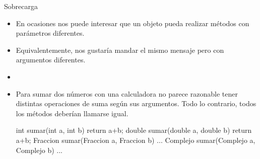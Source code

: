 \documentclass[10pt,envcountsect,spanish]{beamer}
\begin{document}
\begin{frame}[fragile]{Sobrecarga}



\begin{itemize} \large 
\item En ocasiones nos puede interesar que un objeto pueda realizar métodos con parámetros diferentes.

\item Equivalentemente, nos gustaría mandar el mismo mensaje pero con argumentos diferentes.

\item[]


\item[]\hskip -0.25cm\unEjemplo

Para sumar dos números con una calculadora no parece razonable tener distintas operaciones de suma según sus argumentos. Todo lo contrario, todos los métodos deberían llamarse igual.

\begin{code}[caption={Distintas Sumas}]
int    sumar(int a, int b) { return a+b; }
double sumar(double a, double b) { return a+b; }
Fraccion sumar(Fraccion a, Fraccion b) { ... }
Complejo sumar(Complejo a, Complejo b) { ... }
\end{code}
\end{itemize}

\end{frame}
\end{document}
